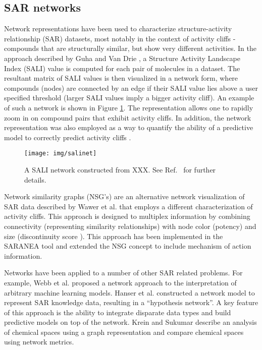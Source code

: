 \documentclass[]{book}
\begin{document}
\subsection{SAR networks}
\label{sec:sar-networks}

Network representations have been used to characterize
structure-activity relationship (SAR) datasets, most notably in the
context of activity cliffs \cite{Maggiora:2006aa} - compounds that are
structurally similar, but show very different activities. In the approach
described by Guha and Van Drie \cite{Guha:2008aa}, a Structure
Activity Landscape Index (SALI) value is computed for each pair of
molecules in a dataset. The resultant matrix of SALI values is then
visualized in a network form, where compounds (nodes) are connected by
an edge if their SALI value lies above a user specified threshold
(larger SALI values imply a bigger activity cliff). An example of such
a network is shown in Figure \ref{fig:salinet}. The representation
allows one to rapidly zoom in on compound pairs that exhibit activity
cliffs. In addition, the network representation was also employed as a
way to quantify the ability of a predictive model to correctly predict
activity cliffs \cite{Guha:2008ab}.

\begin{figure}[h]
  \centering
  \texttt{[image: img/salinet]} 
  \caption{A SALI network constructed from XXX. See Ref.~\cite{Guha:2008aa} for further details.}
  \label{fig:salinet}
\end{figure}

Network similarity graphs (NSG's) are an alternative network
visualization of SAR data described by Wawer et al. \cite{Wawer:2008aa}
that employs a different characterization of activity cliffs. This
approach is designed to multiplex information by combining
connectivity (representing similarity relationships) with node color
(potency) and size (discontinuity score \cite{Peltason:2007aa}). This
approach has been implemented in the SARANEA tool
\cite{Lounkine:2010fk} and extended \cite{Iyer:2011ij} the NSG concept
to include mechanism of action information.

Networks have been applied to a number of other SAR related
problems. For example, Webb et al. \cite{Webb:2014tp} proposed a
network approach to the interpretation of arbitrary machine learning
models. Hanser et al. \cite{Hanser:2014gl} constructed a network model
to represent SAR knowledge data, resulting in a ``hypothesis
network''. A key feature of this approach is the ability to integrate
disparate data types and build predictive models on top of the
network. Krein and Sukumar \cite{Krein:2011tt} describe an analysis of
chemical spaces using a graph representation and compare chemical
spaces using network metrics.
\end{document}
